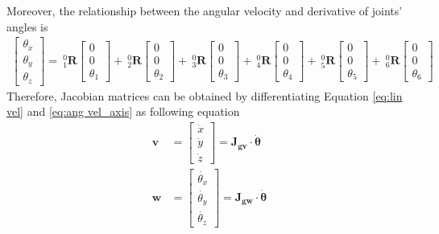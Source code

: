 Moreover, the relationship between the angular velocity and derivative of joints' angles is 
\begin{equation}
\label{eq:ang vel_axis}
\begin{split}
\begin{bmatrix}
\theta _x \\
\theta _y \\
\theta _z 
\end{bmatrix}
=
\ ^0_1\mathbf{R}
\begin{bmatrix}
0 \\ 
0 \\ 
\theta _1
\end{bmatrix}
+
\ ^0_2\mathbf{R}
\begin{bmatrix}
0 \\ 
0 \\ 
\theta _2
\end{bmatrix}
+
\ ^0_3\mathbf{R}
\begin{bmatrix}
0 \\ 
0 \\ 
\theta _3
\end{bmatrix}
+
\ ^0_4\mathbf{R}
\begin{bmatrix}
0 \\ 
0 \\ 
\theta _4
\end{bmatrix}
+
\ ^0_5\mathbf{R}
\begin{bmatrix}
0 \\ 
0 \\ 
\theta _5
\end{bmatrix}
+
\ ^0_6\mathbf{R}
\begin{bmatrix}
0 \\ 
0 \\ 
\theta _6
\end{bmatrix}
\end{split}
\end{equation}
Therefore, Jacobian matrices can be obtained by differentiating Equation \ref{eq:lin vel} and \ref{eq:ang vel_axis} as following equation
\begin{equation}
\begin{split}
\boldsymbol{v} 
&= 
\begin{bmatrix}
\dot{x}\\
\dot{y}\\
\dot{z}
\end{bmatrix}
=
\mathbf{J_{gv}} \cdot \boldsymbol{\dot{\theta}}
\\
\boldsymbol{w} 
&= 
\begin{bmatrix}
\dot{\theta _x}\\
\dot{\theta _y}\\
\dot{\theta _z}
\end{bmatrix}
=
\mathbf{J_{gw}} \cdot \boldsymbol{\dot{\theta}}
\end{split}
\end{equation}
